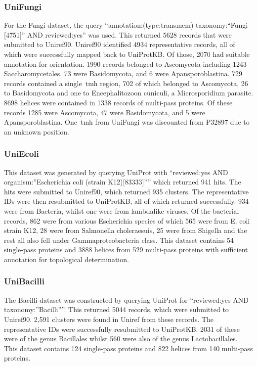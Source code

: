 \subsubsection{UniFungi}
For the Fungi dataset, the query ``annotation:(type:transmem) taxonomy:``Fungi [4751]'' AND reviewed:yes'' was used.
This returned 5628 records that were submitted to Uniref90.
Uniref90 identified 4934 representative records, all of which were successfully mapped back to UniProtKB.
Of those, 2070 had suitable annotation for orientation.
1990 records belonged to Ascomycota including 1243 Saccharomycetales.
73 were Basidomycota, and 6 were Apansporoblastina.
729 records contained a single~\gls{tmh} region, 702 of which belonged to Ascomycota, 26 to Basidomycota and one to Encephalitozoon cuniculi, a Microsporidium parasite.
8698 helices were contained in 1338 records of multi-pass proteins.
Of these records 1285 were Ascomycota, 47 were Basidomycota, and 5 were Apansporoblastina.
One~\gls{tmh} from UniFungi was discounted from P32897 due to an unknown position.

\subsubsection{UniEcoli}
This dataset was generated by querying UniProt with ``reviewed:yes AND organism:''Escherichia coli (strain K12)[83333]'''' which returned 941 hits.
The hits were submitted to Uniref90, which returned 935 clusters.
The representative IDs were then resubmitted to UniProtKB, all of which returned successfully.
934 were from Bacteria, whilst one were from lambdalike viruses.
Of the bacterial records, 862 were from various Escherichia species of which 565 were from E.
coli strain K12, 28 were from Salmonella choleraesuis, 25 were from Shigella and the rest all also fell under Gammaproteobacteria class.
This dataset contains 54 single-pass proteins and 3888 helices from 529 multi-pass proteins with sufficient annotation for topological determination.

\subsubsection{UniBacilli}
The Bacilli dataset was constructed by querying UniProt for ``reviewed:yes AND taxonomy:''Bacilli''''.
This returned 5044 records, which were submitted to Uniref90.
2,591 clusters were found in Uniref from these records.
The representative IDs were successfully resubmitted to UniProtKB.
2031 of these were of the genus Bacillales whilst 560 were also of the genus Lactobacillales.
This dataset contains 124 single-pass proteins and 822 helices from 140 multi-pass proteins.

